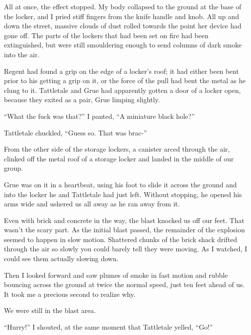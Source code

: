 All at once, the effect stopped.  My body collapsed to the ground at the base of the locker, and I pried stiff fingers from the knife handle and knob.  All up and down the street, massive clouds of dust rolled towards the point her device had gone off.  The parts of the lockers that had been set on fire had been extinguished, but were still smouldering enough to send columns of dark smoke into the air.



Regent had found a grip on the edge of a locker's roof; it had either been bent prior to his getting a grip on it, or the force of the pull had bent the metal as he clung to it.  Tattletale and Grue had apparently gotten a door of a locker open, because they exited as a pair, Grue limping slightly.



``What the fuck was that?'' I panted, ``A miniature black hole?''



Tattletale chuckled, ``Guess so.  That was brac-''



From the other side of the storage lockers, a canister arced through the air, clinked off the metal roof of a storage locker and landed in the middle of our group.



Grue was on it in a heartbeat, using his foot to slide it across the ground and into the locker he and Tattletale had just left.  Without stopping, he opened his arms wide and ushered us all away as he ran away from it.



Even with brick and concrete in the way, the blast knocked us off our feet.  That wasn't the scary part.  As the initial blast passed, the remainder of the explosion seemed to happen in slow motion.  Shattered chunks of the brick shack drifted through the air so slowly you could barely tell they were moving.  As I watched, I could see them actually slowing down.



Then I looked forward and saw plumes of smoke in fast motion and rubble bouncing across the ground at twice the normal speed, just ten feet ahead of us.  It took me a precious second  to realize why.



We were still in the blast area.



``Hurry!'' I shouted, at the same moment that Tattletale yelled, ``Go!''



